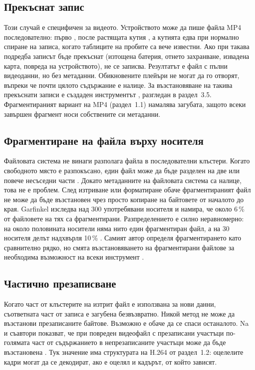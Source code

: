 \subsection{Прекъснат запис}

Този случай е специфичен за видеото. Устройството може да пише файла MP4
последователно: първо , после растящата кутия , а кутията
 едва при нормално спиране на записа, когато таблиците на пробите са вече
известни. Ако при такава подредба записът бъде прекъснат (изтощена батерия, отнето
захранване, извадена карта, повреда на устройството),  не се записва. Резултатът е файл с пълни видеоданни, но без метаданни.
Обикновените плейъри не могат да го отворят, въпреки че почти цялото съдържание е
налице. За възстановяване на такива прекъснати записи е създаден инструментът 
\cite{untrunc},
разгледан в раздел~3.5. Фрагментираният вариант на MP4 (раздел~1.1) намалява загубата,
защото всеки завършен фрагмент носи собствените си метаданни.

\subsection{Фрагментиране на файла върху носителя}

Файловата система не винаги разполага файла в последователни клъстери. Когато свободното
място е разпокъсано, един файл може да бъде разделен на две или повече несъседни части
\cite{garfinkel2007}. Докато метаданните на файловата система са налице, това не е проблем.
След изтриване или форматиране обаче фрагментираният файл не може да бъде възстановен
чрез просто копиране на байтовете от началото до края. Garfinkel изследва над 300 употребявани
носителя и намира, че около 6\,\% от файловете на тях са фрагментирани. Разпределението
е силно неравномерно: на около половината носители няма нито един фрагментиран файл, а
на 30 носителя делът надхвърля 10\,\% \cite{garfinkel2007}. Самият автор определя
фрагментирането като сравнително рядко, но смята възстановяването на фрагментирани файлове
за необходима възможност на всеки инструмент \cite{garfinkel2007}.

\subsection{Частично презаписване}

Когато част от клъстерите на изтрит файл е използвана за нови данни, съответната част
от записа е загубена безвъзвратно. Никой метод не може да възстанови презаписаните
байтове. Възможно е обаче да се спаси останалото. Na и съавтори показват, че при
повреден видеофайл с презаписани участъци по-голямата част от съдържанието в
непрезаписаните участъци може да бъде възстановена \cite{na2014}. Тук значение има
структурата на H.264 от раздел~1.2: оцелелите кадри могат да се декодират, ако е оцелял
и кадърът, от който зависят.

